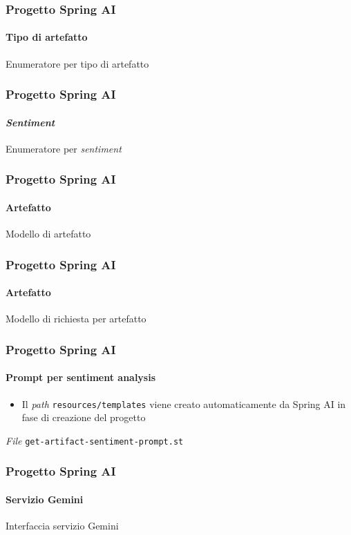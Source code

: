%
\begin{frame}[t,fragile] \frametitle{Progetto Spring AI}
    \framesubtitle{Tipo di artefatto}
        \begin{block}{Enumeratore per tipo di artefatto}
			{\tiny}
    	\end{block}
\end{frame}
%
\begin{frame}[t,fragile] \frametitle{Progetto Spring AI}
    \framesubtitle{\textit{Sentiment}}
        \begin{block}{Enumeratore per \textit{sentiment}}
			{\tiny}
    	\end{block}
\end{frame}
%
\begin{frame}[t,fragile] \frametitle{Progetto Spring AI}
    \framesubtitle{Artefatto}
        \begin{block}{Modello di artefatto}
			{\tiny}
    	\end{block}
\end{frame}
%
\begin{frame}[t,fragile] \frametitle{Progetto Spring AI}
    \framesubtitle{Artefatto}
        \begin{block}{Modello di richiesta per artefatto}
			{\tiny}
    	\end{block}
\end{frame}
%
\begin{frame}[t,fragile] \frametitle{Progetto Spring AI}
    \framesubtitle{Prompt per sentiment analysis}
        \begin{itemize}[leftmargin=10pt,align=right]
		    \item[\alert{\faExclamationTriangle}] Il \textit{path} \texttt{resources/templates} viene creato automaticamente da Spring AI in fase di creazione del progetto
        \end{itemize}
        \begin{block}{\textit{File} \texttt{get-artifact-sentiment-prompt.st}}
			{\scriptsize}
    	\end{block}
\end{frame}
%
\begin{frame}[t,fragile] \frametitle{Progetto Spring AI}
    \framesubtitle{Servizio Gemini}
        \begin{block}{Interfaccia servizio Gemini}
{\tiny}
    \end{block}
\end{frame}

